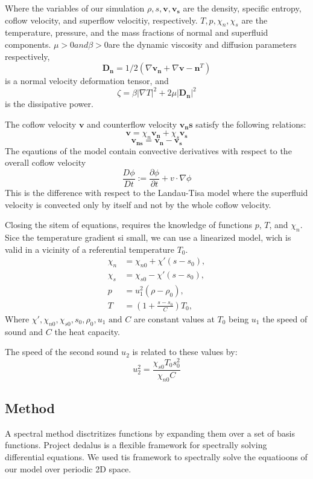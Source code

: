 \documentclass{article}
\begin{document}
Where the variables of our simulation  \(\rho, s, \mathbf{v}, \mathbf{v_s}\) are the density, specific entropy, coflow velocity, and superflow velocitiy, respectively.
\(T, p, \chi_n, \chi_s\) are the temperature, pressure, and the mass fractions of normal and superfluid components. 
\(\mu > 0 and \beta>0 \)are the dynamic viscosity and diffusion parameters respectively, 
\[\mathbf{D_n} = 1/2(\nabla \mathbf{v_n} +  \nabla \mathbf{v-n}^T)\] 
is a normal velocity deformation tensor, and
\[\zeta = \beta |\nabla T|^2 + 2 \mu |\mathbf{D_n}|^2\]
is the dissipative power.


The coflow velocity \(\mathbf{v}\) and counterflow velocity \( \mathbf{v_ns}\) satisfy the following relations:
\[\mathbf{v} = \chi_n \mathbf{v_n} + \chi_s \mathbf{v_s}\]
\[\mathbf{v_{ns}}  = \mathbf{v_n} - \mathbf{v_s}\]
The eqautions of the model contain convective derivatives with respect to the overall coflow velocity
\[\frac{D\phi}{Dt} := \frac{\partial \phi}{\partial t} + v \cdot \nabla \phi\]
This is the difference with respect to the Landau-Tisa model where the superfluid velocity is convected only by itself and not by the whole coflow velocity.

Closing the sitem of equations, requires the knowledge of functions \(p\), \(T\), and \(\chi_n\).
Sice the temperature gradient si small, we can use a linearized model, wich is valid in a vicinity of a referential temperature \(T_0\).
\begin{align}
    \chi_n &= \chi_{n0} + \chi'(s-s_0),\\
    \chi_s &= \chi_{s0} - \chi'(s-s_0),\\
    p &= u_1^2(\rho-\rho_0), \\
    T &= (1+\frac{s-s_0}{C})T_0,
\end{align}
Where \(\chi', \chi_{n0}, \chi_{s0}, s_0, \rho_0, u_1 \text{ and } C\) are constant values at \(T_0\) being 
\(u_1\) the speed of sound and \(C\) the heat capacity. 

The speed of the second sound \(u_2\) is related to these values by:
\[u_2^2 = \frac{\chi_{s0}T_0s_0^2}{\chi_{n0}C}\]
\subsection{Method}
A spectral method disctritizes functions by expanding them over a set of basis functions.
Project dedalus is a flexible framework for spectrally solving differential equations. We used tis framework to spectrally solve the equatioons of our model over periodic 2D space.
\end{document}
